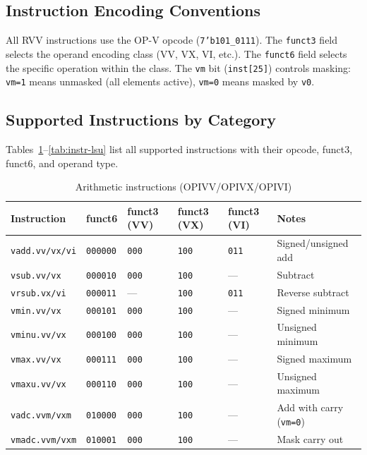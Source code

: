 \subsection{Instruction Encoding Conventions}

All RVV instructions use the OP-V opcode (\texttt{7'b101\_0111}). The \texttt{funct3}
field selects the operand encoding class (VV, VX, VI, etc.). The \texttt{funct6} field
selects the specific operation within the class. The \texttt{vm} bit (\texttt{inst[25]})
controls masking: \texttt{vm=1} means unmasked (all elements active),
\texttt{vm=0} means masked by \texttt{v0}.

\subsection{Supported Instructions by Category}

Tables~\ref{tab:instr-arith}--\ref{tab:instr-lsu} list all supported instructions
with their opcode, funct3, funct6, and operand type.

\begin{table}[H]
  \centering
  \caption{Arithmetic instructions (OPIVV/OPIVX/OPIVI)}
  \label{tab:instr-arith}
  \begin{tabular}{@{}llllll@{}}
    \toprule
    \textbf{Instruction} & \textbf{funct6} & \textbf{funct3 (VV)} & \textbf{funct3 (VX)} & \textbf{funct3 (VI)} & \textbf{Notes} \\
    \midrule
    \texttt{vadd.vv/vx/vi}   & \texttt{000000} & \texttt{000} & \texttt{100} & \texttt{011} & Signed/unsigned add \\
    \texttt{vsub.vv/vx}      & \texttt{000010} & \texttt{000} & \texttt{100} & ---          & Subtract \\
    \texttt{vrsub.vx/vi}     & \texttt{000011} & ---          & \texttt{100} & \texttt{011} & Reverse subtract \\
    \texttt{vmin.vv/vx}      & \texttt{000101} & \texttt{000} & \texttt{100} & ---          & Signed minimum \\
    \texttt{vminu.vv/vx}     & \texttt{000100} & \texttt{000} & \texttt{100} & ---          & Unsigned minimum \\
    \texttt{vmax.vv/vx}      & \texttt{000111} & \texttt{000} & \texttt{100} & ---          & Signed maximum \\
    \texttt{vmaxu.vv/vx}     & \texttt{000110} & \texttt{000} & \texttt{100} & ---          & Unsigned maximum \\
    \texttt{vadc.vvm/vxm}    & \texttt{010000} & \texttt{000} & \texttt{100} & ---          & Add with carry (\texttt{vm=0}) \\
    \texttt{vmadc.vvm/vxm}   & \texttt{010001} & \texttt{000} & \texttt{100} & ---          & Mask carry out \\
    \bottomrule
  \end{tabular}
\end{table}

